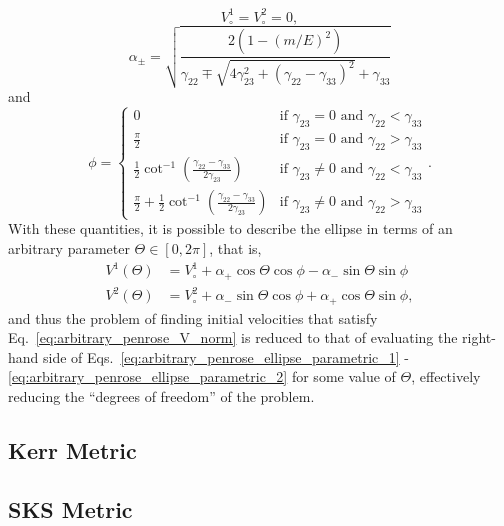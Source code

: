 %
\begin{equation}
  V^1_\circ = V^2_\circ = 0,
  \label{eq:arbitrary_penrose_ellipse_centers}
\end{equation}
%
\begin{equation}
  \alpha_\pm = \sqrt{ \frac{2 \left( 1 - \left(m/E\right)^2 \right)}{\gamma_{22} \mp \sqrt{4 \gamma_{23}^2 + \left( \gamma_{22} - \gamma_{33} \right)^2} +\gamma_{33}} }
  \label{eq:arbitrary_penrose_ellipse_axis}
\end{equation}
%
and
\begin{equation}
  \phi =
  \begin{cases}
    0                                                                                                 & \text{if } \gamma_{23} = 0 \text{ and } \gamma_{22} < \gamma_{33}    \\
    \frac{\pi}{2}                                                                                     & \text{if } \gamma_{23} = 0 \text{ and } \gamma_{22} > \gamma_{33}    \\
    \frac{1}{2} \cot^{-1} \left( \frac{\gamma_{22}-\gamma_{33}}{2\gamma_{23}} \right)                 & \text{if } \gamma_{23} \neq 0 \text{ and } \gamma_{22} < \gamma_{33} \\
    \frac{\pi}{2} + \frac{1}{2} \cot^{-1} \left( \frac{\gamma_{22}-\gamma_{33}}{2\gamma_{23}} \right) & \text{if } \gamma_{23} \neq 0 \text{ and } \gamma_{22} > \gamma_{33}
  \end{cases}
  .
  \label{eq:arbitrary_penrose_ellipse_angle}
\end{equation}
%
With these quantities, it is possible to describe the ellipse in terms of an arbitrary parameter $\Theta \in \left[0,2\pi\right]$, that is,
%
\begin{align}
  V^{1}\left(\Theta\right) & =  V^{1}_\circ + \alpha_{+} \cos\Theta\cos\phi - \alpha_{-}\sin\Theta\sin\phi                                                  \label{eq:arbitrary_penrose_ellipse_parametric_1} \\
  V^{2}\left(\Theta\right) & = V^{2}_\circ + \alpha_{-} \sin\Theta\cos\phi + \alpha_{+}\cos\Theta\sin\phi, \label{eq:arbitrary_penrose_ellipse_parametric_2}
\end{align}
%
and thus the problem of finding initial velocities that satisfy Eq.~\eqref{eq:arbitrary_penrose_V_norm} is reduced to that of evaluating the right-hand side of Eqs.~\eqref{eq:arbitrary_penrose_ellipse_parametric_1} - \eqref{eq:arbitrary_penrose_ellipse_parametric_2} for some value of $\Theta$, effectively reducing the ``degrees of freedom'' of the problem.

\subsection{Kerr Metric}
\label{ch:kerr_example}


\subsection{SKS Metric}
